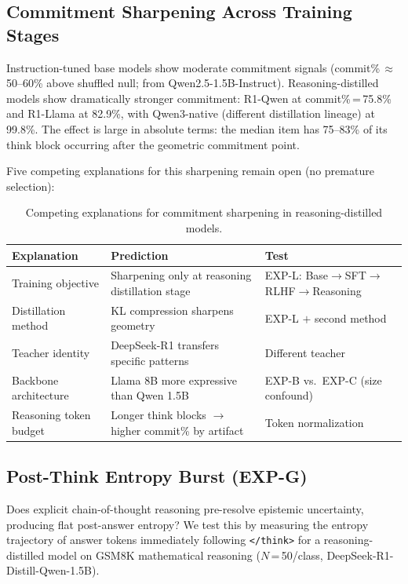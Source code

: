 \documentclass[11pt]{article}
\begin{document}
\subsection{Commitment Sharpening Across Training Stages}

Instruction-tuned base models show moderate commitment signals (commit\%\,$\approx$\,50--60\%
above shuffled null; from Qwen2.5-1.5B-Instruct). Reasoning-distilled models show
dramatically stronger commitment: R1-Qwen at commit\%\,=\,75.8\% and R1-Llama at 82.9\%,
with Qwen3-native (different distillation lineage) at 99.8\%. The effect is large in
absolute terms: the median item has 75--83\% of its think block occurring after the
geometric commitment point.

Five competing explanations for this sharpening remain open (no premature selection):

\begin{table}[h!]
\centering
\caption{Competing explanations for commitment sharpening in reasoning-distilled models.}
\begin{tabular}{L{3.5cm}L{4cm}L{4cm}}
\toprule
Explanation & Prediction & Test \\
\midrule
Training objective & Sharpening only at reasoning distillation stage & EXP-L: Base$\to$SFT$\to$RLHF$\to$Reasoning \\
Distillation method & KL compression sharpens geometry & EXP-L $+$ second method \\
Teacher identity & DeepSeek-R1 transfers specific patterns & Different teacher \\
Backbone architecture & Llama 8B more expressive than Qwen 1.5B & EXP-B vs.\ EXP-C (size confound) \\
Reasoning token budget & Longer think blocks $\to$ higher commit\% by artifact & Token normalization \\
\bottomrule
\end{tabular}
\end{table}

\subsection{Post-Think Entropy Burst (EXP-G)}

Does explicit chain-of-thought reasoning pre-resolve epistemic uncertainty, producing
flat post-answer entropy? We test this by measuring the entropy trajectory of answer
tokens immediately following \texttt{</think>} for a reasoning-distilled model on
GSM8K mathematical reasoning ($N$\,=\,50/class, DeepSeek-R1-Distill-Qwen-1.5B).
\end{document}
